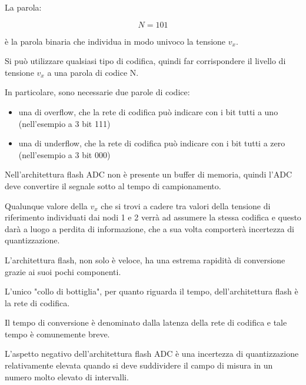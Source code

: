 La parola: 

{
    \Large 
    \begin{equation}
        N = 101
    \end{equation}
}

è la parola binaria che individua in modo univoco la tensione $v_x$. \newline 

Si può utilizzare qualsiasi tipo di codifica, quindi far corrispondere il livello di tensione $v_x$ a una parola di codice N. \newline 

In particolare, sono necessarie due parole di codice: 

\begin{itemize}
    \item una di overflow, che la rete di codifica può indicare con i bit tutti a uno (nell'esempio a 3 bit 111) 
    \item una di underflow, che la rete di codifica può indicare con i bit tutti a zero (nell'esempio a 3 bit 000)
\end{itemize}

Nell'architettura flash ADC non è presente un buffer di memoria, quindi l'ADC deve convertire il segnale sotto al tempo di campionamento. \newline 

Qualunque valore della $v_x$ che si trovi a cadere tra valori della tensione di riferimento individuati dai nodi 1 e 2 verrà ad assumere la stessa codifica 
e questo darà a luogo a perdita di informazione, che a sua volta comporterà incertezza di quantizzazione. \newline 

L'architettura flash, non solo è veloce, ha una estrema rapidità di conversione grazie ai suoi pochi componenti. \newline 

L'unico "collo di bottiglia", per quanto riguarda il tempo, dell'architettura flash è la rete di codifica. \newline 

Il tempo di conversione è denominato dalla latenza della rete di codifica e tale tempo è comunemente breve. \newline 

L'aspetto negativo dell'architettura flash ADC è una incertezza di quantizzazione relativamente elevata quando si deve suddividere il campo di misura in un numero molto elevato di intervalli. \newline 

